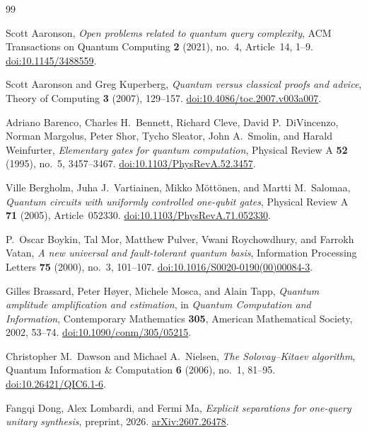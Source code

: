 \begin{thebibliography}{99}

Scott Aaronson,
\emph{Open problems related to quantum query complexity},
ACM Transactions on Quantum Computing \textbf{2} (2021), no.~4,
Article~14, 1--9.
\href{https://doi.org/10.1145/3488559}{doi:10.1145/3488559}.

Scott Aaronson and Greg Kuperberg,
\emph{Quantum versus classical proofs and advice},
Theory of Computing \textbf{3} (2007), 129--157.
\href{https://doi.org/10.4086/toc.2007.v003a007}{doi:10.4086/toc.2007.v003a007}.

Adriano Barenco, Charles H.\ Bennett, Richard Cleve, David P.\ DiVincenzo,
Norman Margolus, Peter Shor, Tycho Sleator, John A.\ Smolin, and Harald Weinfurter,
\emph{Elementary gates for quantum computation},
Physical Review A \textbf{52} (1995), no.~5, 3457--3467.
\href{https://doi.org/10.1103/PhysRevA.52.3457}{doi:10.1103/PhysRevA.52.3457}.

Ville Bergholm, Juha J.\ Vartiainen, Mikko M\"ott\"onen, and Martti M.\ Salomaa,
\emph{Quantum circuits with uniformly controlled one-qubit gates},
Physical Review A \textbf{71} (2005), Article~052330.
\href{https://doi.org/10.1103/PhysRevA.71.052330}{doi:10.1103/PhysRevA.71.052330}.

P.~Oscar Boykin, Tal Mor, Matthew Pulver, Vwani Roychowdhury, and Farrokh Vatan,
\emph{A new universal and fault-tolerant quantum basis},
Information Processing Letters \textbf{75} (2000), no.~3, 101--107.
\href{https://doi.org/10.1016/S0020-0190(00)00084-3}{doi:10.1016/S0020-0190(00)00084-3}.

Gilles Brassard, Peter H\o yer, Michele Mosca, and Alain Tapp,
\emph{Quantum amplitude amplification and estimation},
in \emph{Quantum Computation and Information},
Contemporary Mathematics \textbf{305},
American Mathematical Society, 2002, 53--74.
\href{https://doi.org/10.1090/conm/305/05215}{doi:10.1090/conm/305/05215}.

Christopher M.\ Dawson and Michael A.\ Nielsen,
\emph{The Solovay--Kitaev algorithm},
Quantum Information \& Computation \textbf{6} (2006), no.~1, 81--95.
\href{https://doi.org/10.26421/QIC6.1-6}{doi:10.26421/QIC6.1-6}.

Fangqi Dong, Alex Lombardi, and Fermi Ma,
\emph{Explicit separations for one-query unitary synthesis},
preprint, 2026.
\href{https://arxiv.org/abs/2607.26478}{arXiv:2607.26478}.


\end{thebibliography}

